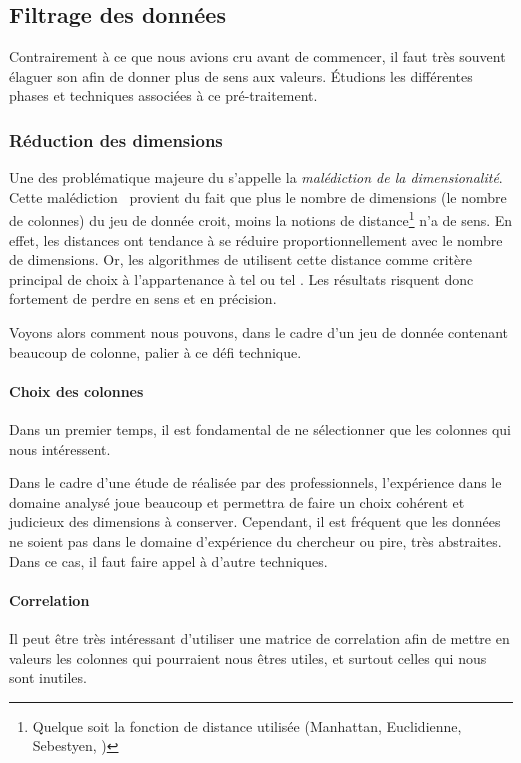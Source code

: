 \subsection{Filtrage des données}
Contrairement à ce que nous avions cru avant de commencer, il faut très souvent élaguer son  afin de donner plus de sens aux valeurs. Étudions les différentes phases et techniques associées à ce pré-traitement.

\subsubsection{Réduction des dimensions}
Une des problématique majeure du  s'appelle la \emph{malédiction de la dimensionalité}. Cette \og malédiction\fg~ provient du fait que plus le nombre de dimensions (\ie le nombre de colonnes) du jeu de donnée croit, moins la notions de distance\footnote{Quelque soit la fonction de distance utilisée (Manhattan, Euclidienne, Sebestyen, \etc)} n'a de sens. En effet, les distances ont tendance à se réduire proportionnellement avec le nombre de dimensions. Or, les algorithmes de  utilisent cette distance comme critère principal de choix à l'appartenance à tel ou tel . Les résultats risquent donc fortement de perdre en sens et en précision.

Voyons alors comment nous pouvons, dans le cadre d'un jeu de donnée contenant beaucoup de colonne, palier à ce défi technique.

\paragraph{Choix des colonnes}
Dans un premier temps, il est fondamental de ne sélectionner que les colonnes qui nous intéressent.

Dans le cadre d'une étude de  réalisée par des professionnels, l'expérience dans le domaine analysé joue beaucoup et permettra de faire un choix cohérent et judicieux des dimensions à conserver. Cependant, il est fréquent que les données ne soient pas dans le domaine d'expérience du chercheur ou pire, très abstraites. Dans ce cas, il faut faire appel à d'autre techniques.

\paragraph{Correlation}
Il peut être très intéressant d'utiliser une matrice de correlation afin de mettre en valeurs les colonnes qui pourraient nous êtres utiles, et surtout celles qui nous sont inutiles.

